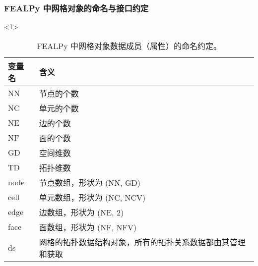 \documentclass{beamer}
\numberwithin{subsection}{section}
\begin{document}
\begin{frame}
    \frametitle{FEALPy 中网格对象的命名与接口约定}
\begin{onlyenv}<1>
    \begin{table}[H]
    \scriptsize
    \centering
    \begin{tabular}{|l|l|}\hline
        变量名 & 含义\\\hline
        NN	& 节点的个数\\\hline
        NC	& 单元的个数\\\hline
        NE	& 边的个数\\\hline
        NF	& 面的个数\\\hline
        GD	& 空间维数\\\hline
        TD	& 拓扑维数\\\hline
        node& 节点数组，形状为 (NN, GD)\\\hline
        cell& 单元数组，形状为 (NC, NCV)\\\hline
        edge& 边数组，形状为 (NE, 2)\\\hline
        face& 面数组，形状为 (NF, NFV)\\\hline
        ds	& 网格的拓扑数据结构对象，所有的拓扑关系数据都由其管理和获取\\\hline
    \end{tabular}
    \caption{FEALPy 中网格对象数据成员（属性）的命名约定。}
    \end{table}
\end{onlyenv}


\end{frame}
\end{document}

